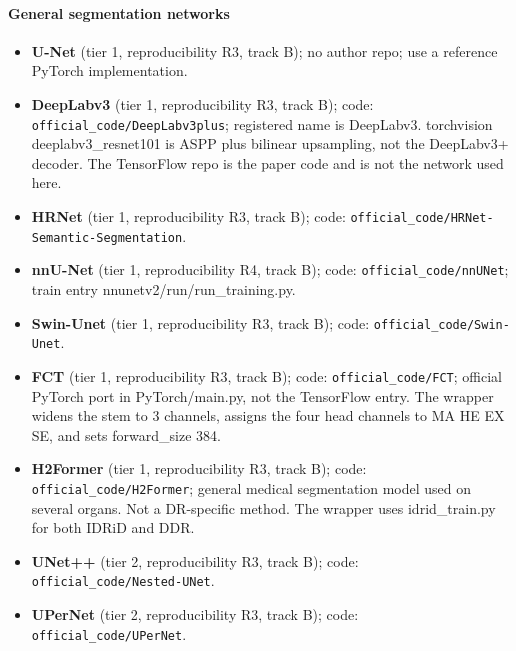 \paragraph{General segmentation networks}
\begin{itemize}[leftmargin=*,itemsep=1pt]
\item \textbf{U-Net} (tier 1, reproducibility R3, track B); no author repo; use a reference PyTorch implementation.
\item \textbf{DeepLabv3} (tier 1, reproducibility R3, track B); code: \texttt{official\_code/DeepLabv3plus}; registered name is DeepLabv3. torchvision deeplabv3\_resnet101 is ASPP plus bilinear upsampling, not the DeepLabv3+ decoder. The TensorFlow repo is the paper code and is not the network used here.
\item \textbf{HRNet} (tier 1, reproducibility R3, track B); code: \texttt{official\_code/HRNet-Semantic-Segmentation}.
\item \textbf{nnU-Net} (tier 1, reproducibility R4, track B); code: \texttt{official\_code/nnUNet}; train entry nnunetv2/run/run\_training.py.
\item \textbf{Swin-Unet} (tier 1, reproducibility R3, track B); code: \texttt{official\_code/Swin-Unet}.
\item \textbf{FCT} (tier 1, reproducibility R3, track B); code: \texttt{official\_code/FCT}; official PyTorch port in PyTorch/main.py, not the TensorFlow entry. The wrapper widens the stem to 3 channels, assigns the four head channels to MA HE EX SE, and sets forward\_size 384.
\item \textbf{H2Former} (tier 1, reproducibility R3, track B); code: \texttt{official\_code/H2Former}; general medical segmentation model used on several organs. Not a DR-specific method. The wrapper uses idrid\_train.py for both IDRiD and DDR.
\item \textbf{UNet++} (tier 2, reproducibility R3, track B); code: \texttt{official\_code/Nested-UNet}.
\item \textbf{UPerNet} (tier 2, reproducibility R3, track B); code: \texttt{official\_code/UPerNet}.
\end{itemize}
